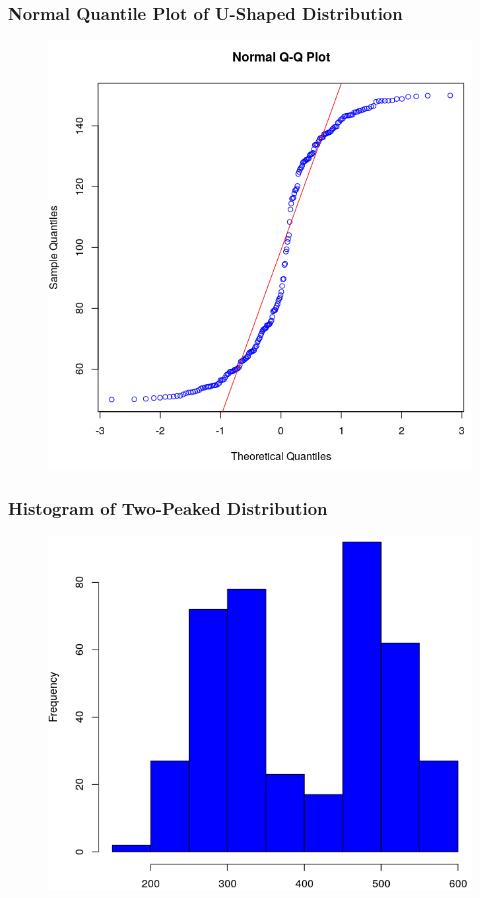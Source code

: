 \documentclass[xcolor=dvipsnames]{beamer}
\begin{document}
\begin{frame}
  \frametitle{Normal Quantile Plot of U-Shaped Distribution}
\begin{figure}[h]
\includegraphics[scale=.35]{./diagrams/an-unqp.png}
\end{figure}
\end{frame}

\begin{frame}
  \frametitle{Histogram of Two-Peaked Distribution}
\begin{figure}[h]
\includegraphics[scale=.4]{./diagrams/an-2phist.png}
\end{figure}
\end{frame}
\end{document}
